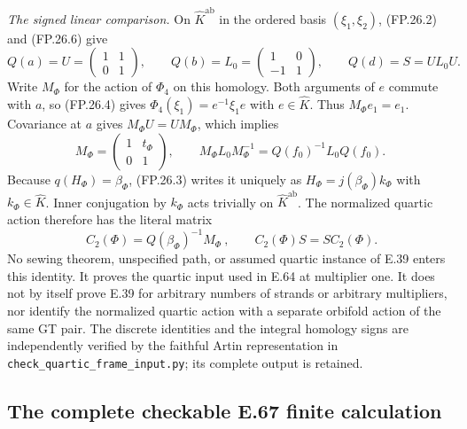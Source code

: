 \emph{The signed linear comparison.}
On $\widehat K^{\mathrm{ab}}$ in the ordered basis
$(\xi_1,\xi_2)$, (FP.26.2) and (FP.26.6) give
\[
 Q(a)=U=\begin{pmatrix}1&1\\0&1\end{pmatrix},\qquad
 Q(b)=L_0=\begin{pmatrix}1&0\\-1&1\end{pmatrix},\qquad
 Q(d)=S=UL_0U.
\]
Write $M_\Phi$ for the action of $\Phi_4$ on this homology.
Both arguments of $e$ commute with $a$, so (FP.26.4) gives
$\Phi_4(\xi_1)=e^{-1}\xi_1e$ with $e\in\widehat K$.
Thus $M_\Phi e_1=e_1$. Covariance at $a$ gives
$M_\Phi U=UM_\Phi$, which implies
\[
 M_\Phi=\begin{pmatrix}1&t_\Phi\\0&1\end{pmatrix},\qquad
 M_\Phi L_0M_\Phi^{-1}
       =Q(f_0)^{-1}L_0Q(f_0).
\]
Because $q(H_\Phi)=\beta_\Phi$, (FP.26.3) writes it uniquely as
$H_\Phi=j(\beta_\Phi)k_\Phi$ with $k_\Phi\in\widehat K$.
Inner conjugation by $k_\Phi$ acts trivially on
$\widehat K^{\mathrm{ab}}$. The normalized quartic action therefore
has the literal matrix
\[
 \boxed{\ C_2(\Phi)=Q(\beta_\Phi)^{-1}M_\Phi\ },\qquad
 C_2(\Phi)S=SC_2(\Phi).
 \tag{FP.26.8}
\]
No sewing theorem, unspecified path, or assumed quartic instance of E.39
enters this identity. It proves the quartic input used in E.64 at
multiplier one. It does not by itself prove E.39 for arbitrary numbers
of strands or arbitrary multipliers, nor identify the normalized quartic
action with a separate orbifold action of the same GT pair.
The discrete identities and the integral homology signs are independently
verified by the faithful Artin representation in
\texttt{check\_quartic\_frame\_input.py}; its complete output is retained.

\subsection{The complete checkable E.67 finite calculation}


